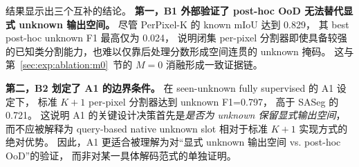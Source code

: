 \documentclass[3p,twocolumn,authoryear]{elsarticle}
\begin{document}
\begin{table}[!t]
\centering
\footnotesize
\setlength{\tabcolsep}{4pt}
\caption{Synapse 上独立架构 baseline 的结果汇总（单次实验，seed=42）。
`direct` 表示模型直接输出的 unknown 类掩码；
`post-hoc` 表示在闭集或 $K+1$ 分割器上额外施加的检测信号；
表中的 \texttt{---} 表示该指标在该协议/设定下不适用或未报告。}\label{tab:indep_main}
\end{table}

结果显示出三个互补的结论。
\textbf{第一，B1 外部验证了 post-hoc OoD 无法替代显式 unknown 输出空间。}
尽管 PerPixel-K 的 known mIoU 达到 0.829，
其 best post-hoc unknown F1 最高仅为 0.024，
说明闭集 per-pixel 分割器即使具备较强的已知类分割能力，也难以仅靠后处理分数形成空间连贯的 unknown 掩码。
这与第~\ref{sec:exp:ablation:m0}~节的 $M=0$ 消融形成一致证据链。

\textbf{第二，B2 划定了 A1 的边界条件。}
在 seen-unknown fully supervised 的 A1 设定下，
标准 $K+1$ per-pixel 分割器达到 unknown F1=0.797，
高于 SASeg 的 0.721。
这说明 A1 的关键设计决策首先是\emph{是否为 unknown 保留显式输出空间}，
而不应被解释为 query-based native unknown slot 相对于标准 $K+1$ 实现方式的绝对优势。
因此，A1 更适合被理解为对“显式 unknown 输出空间 vs. post-hoc OoD”的验证，
而非对某一具体解码范式的单独证明。
\end{document}
